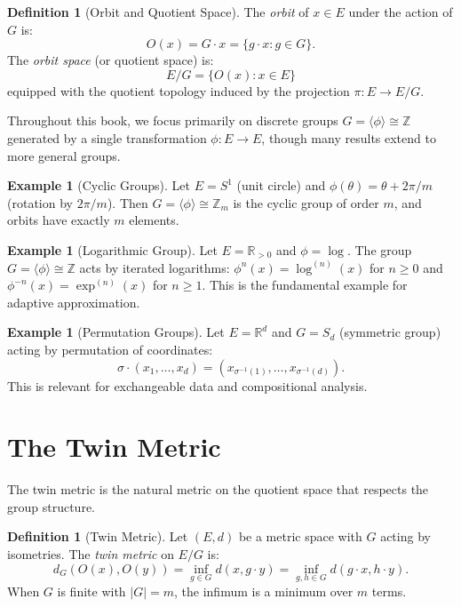 \documentclass[11pt,twoside,openright]{book}
\theoremstyle{plain}
\theoremstyle{definition}
\newtheorem{definition}[theorem]{Definition}
\newtheorem{example}[theorem]{Example}
\theoremstyle{remark}
\newcommand{\Rd}{\mathbb{R}}
\newcommand{\Zd}{\mathbb{Z}}
\begin{document}
\begin{definition}[Orbit and Quotient Space]
The \emph{orbit} of $x \in E$ under the action of $G$ is:
\[
O(x) = G \cdot x = \{g \cdot x : g \in G\}.
\]
The \emph{orbit space} (or quotient space) is:
\[
E/G = \{O(x) : x \in E\}
\]
equipped with the quotient topology induced by the projection $\pi : E \to E/G$.
\end{definition}

Throughout this book, we focus primarily on discrete groups $G = \langle \phi \rangle \cong \Zd$ generated by a single transformation $\phi : E \to E$, though many results extend to more general groups.

\begin{example}[Cyclic Groups]
\label{ex:cyclic}
Let $E = S^1$ (unit circle) and $\phi(\theta) = \theta + 2\pi/m$ (rotation by $2\pi/m$). Then $G = \langle \phi \rangle \cong \Zd_m$ is the cyclic group of order $m$, and orbits have exactly $m$ elements.
\end{example}

\begin{example}[Logarithmic Group]
\label{ex:log}
Let $E = \Rd_{>0}$ and $\phi = \log$. The group $G = \langle \phi \rangle \cong \Zd$ acts by iterated logarithms: $\phi^n(x) = \log^{(n)}(x)$ for $n \geq 0$ and $\phi^{-n}(x) = \exp^{(n)}(x)$ for $n \geq 1$. This is the fundamental example for adaptive approximation.
\end{example}

\begin{example}[Permutation Groups]
Let $E = \Rd^d$ and $G = S_d$ (symmetric group) acting by permutation of coordinates:
\[
\sigma \cdot (x_1, \ldots, x_d) = (x_{\sigma^{-1}(1)}, \ldots, x_{\sigma^{-1}(d)}).
\]
This is relevant for exchangeable data and compositional analysis.
\end{example}

\section{The Twin Metric}

The twin metric is the natural metric on the quotient space that respects the group structure.

\begin{definition}[Twin Metric]
\label{def:twin-metric}
Let $(E, d)$ be a metric space with $G$ acting by isometries. The \emph{twin metric} on $E/G$ is:
\begin{equation}
d_G(O(x), O(y)) = \inf_{g \in G} d(x, g \cdot y) = \inf_{g, h \in G} d(g \cdot x, h \cdot y).
\label{eq:twin-metric}
\end{equation}
When $G$ is finite with $|G| = m$, the infimum is a minimum over $m$ terms.
\end{definition}
\end{document}
